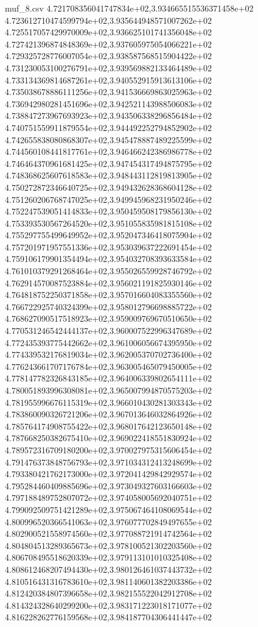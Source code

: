 \begin{filecontents*}{muf_8.csv}
4.721708356041747834e+02,3.934665515536371458e+02
4.723612710474599794e+02,3.935644948571007262e+02
4.725517057429970009e+02,3.936625101741356048e+02
4.727421396874848369e+02,3.937605975054066221e+02
4.729325728776007054e+02,3.938587568515904422e+02
4.731230053100276791e+02,3.939569882133464489e+02
4.733134369814687261e+02,3.940552915913613106e+02
4.735038678886111256e+02,3.941536669863025963e+02
4.736942980281451696e+02,3.942521143988506083e+02
4.738847273967693923e+02,3.943506338296856484e+02
4.740751559911879554e+02,3.944492252794852902e+02
4.742655838080868307e+02,3.945478887489225599e+02
4.744560108441817761e+02,3.946466242386986778e+02
4.746464370961681425e+02,3.947454317494875795e+02
4.748368625607618583e+02,3.948443112819813905e+02
4.750272872346640725e+02,3.949432628368604128e+02
4.751260206768747025e+02,3.949945968231950246e+02
4.752247539051414833e+02,3.950459508179856130e+02
4.753393530567264520e+02,3.951055835981815108e+02
4.755297755499649952e+02,3.952047346418075904e+02
4.757201971957551336e+02,3.953039637222691454e+02
4.759106179901354494e+02,3.954032708393633584e+02
4.761010379291268464e+02,3.955026559928746792e+02
4.762914570087523884e+02,3.956021191825930146e+02
4.764818752250371858e+02,3.957016604083355560e+02
4.766722925740324399e+02,3.958012796698885722e+02
4.768627090517518923e+02,3.959009769670510650e+02
4.770531246542444137e+02,3.960007522996347689e+02
4.772435393775442662e+02,3.961006056674395950e+02
4.774339532176819034e+02,3.962005370702736400e+02
4.776243661707176784e+02,3.963005465079450005e+02
4.778147782326843185e+02,3.964006339802654111e+02
4.780051893996308081e+02,3.965007994870575203e+02
4.781955996676115319e+02,3.966010430281303343e+02
4.783860090326721206e+02,3.967013646032864926e+02
4.785764174908755422e+02,3.968017642123650148e+02
4.787668250382675410e+02,3.969022418551830924e+02
4.789572316709180200e+02,3.970027975315606454e+02
4.791476373848756793e+02,3.971034312413248699e+02
4.793380421762173000e+02,3.972041429842929574e+02
4.795284460409885696e+02,3.973049327603166603e+02
4.797188489752807072e+02,3.974058005692040751e+02
4.799092509751421289e+02,3.975067464108069544e+02
4.800996520366541063e+02,3.976077702849497655e+02
4.802900521558974560e+02,3.977088721914742564e+02
4.804804513289365673e+02,3.978100521302203560e+02
4.806708495518620339e+02,3.979113101010325408e+02
4.808612468207494430e+02,3.980126461037443732e+02
4.810516431316783610e+02,3.981140601382203386e+02
4.812420384807396658e+02,3.982155522042912708e+02
4.814324328640299200e+02,3.983171223018171077e+02
4.816228262776159568e+02,3.984187704306441447e+02

\end{filecontents*}
